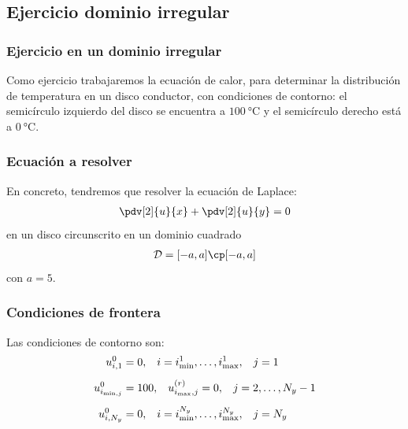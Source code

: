 \subsection{Ejercicio dominio irregular}
\begin{frame}
\frametitle{Ejercicio en un dominio irregular}
Como ejercicio trabajaremos la ecuación de calor, para determinar la distribución de temperatura en un disco conductor, con condiciones de contorno: el semicírculo izquierdo del disco se encuentra a $\SI{100}{\degreeCelsius}$ y el semicírculo derecho está a $\SI{0}{\degreeCelsius}$.
\end{frame}
\begin{frame}
\frametitle{Ecuación a resolver}
En concreto, tendremos que resolver la ecuación de Laplace:
\begin{align}
\pdv[2]{u}{x} + \pdv[2]{u}{y} = 0
\label{eq:ecuacion_13_34}
\end{align}
en un disco circunscrito en un dominio cuadrado 
\begin{align*}
\mathcal{D} = [-a, a] \cp [-a, a]
\end{align*}
con $a = 5$.
\end{frame}
\begin{frame}
\frametitle{Condiciones de frontera}
Las condiciones de contorno son:
\begin{align}
\begin{aligned}
u_{i, 1}^{0} &= 0, \hspace{0.3cm} i = i_{\min}^{1}, \ldots, i_{\max}^{1}, \hspace{0.3cm} j = 1 \\[0.5em]
u_{i_{\min, j}}^{0} &= 100, \hspace{0.3cm} u_{i_{\max}, j}^{(r)} = 0, \hspace{0.3cm} j = 2, \ldots, N_{y} - 1 \\[0.5em]
u_{i, N_{y}}^{0} &= 0, \hspace{0.3cm} i = i_{\min}^{N_{y}}, \ldots, i_{\max}^{N_{y}}, \hspace{0.3cm} j = N_{y}
\end{aligned}
\label{eq:ecuacion_13_35}
\end{align}
\end{frame}

